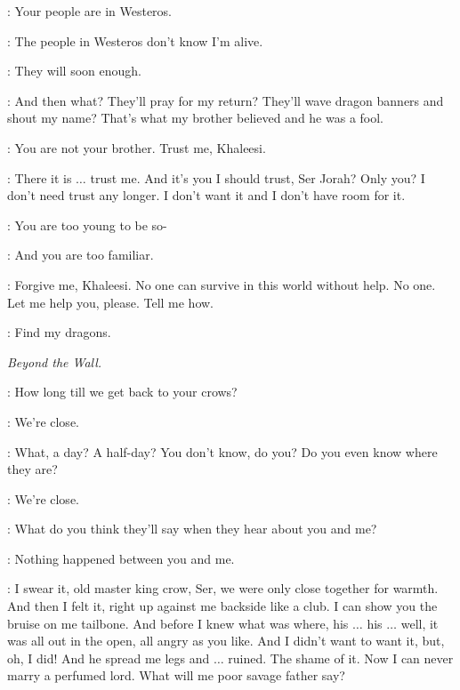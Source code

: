 \JORAH: Your people are in Westeros.

\DAENERYS: The people in Westeros don't know I'm alive.

\JORAH: They will soon enough.

\DAENERYS: And then what? They'll pray for my return? They'll wave dragon banners and shout my name? That's what my brother believed and he was a fool.

\JORAH: You are not your brother. Trust me, Khaleesi.

\DAENERYS: There it is $\ldots$  trust me. And it's you I should trust, Ser Jorah? Only you? I don't need trust any longer. I don't want it and I don't have room for it.

\JORAH: You are too young to be so-


\DAENERYS: And you are too familiar.

\JORAH: Forgive me, Khaleesi. No one can survive in this world without help. No one. Let me help you, please. Tell me how.

\DAENERYS: Find my dragons.


\scene

\textit{Beyond the Wall.}


\YGRITTE: How long till we get back to your crows?

\JON: We're close.

\YGRITTE: What, a day? A half-day? You don't know, do you? Do you even know where they are?

\JON: We're close.

\YGRITTE: What do you think they'll say when they hear about you and me?

\JON: Nothing happened between you and me.


\YGRITTE: I swear it, old master king crow, Ser, we were only close together for warmth. And then I felt it, right up against me backside like a club. I can show you the bruise on me tailbone. And before I knew what was where, his $\ldots$ his $\ldots$ well, it was all out in the open, all angry as you like. And I didn't want to want it, but, oh, I did! And he spread me legs and $\ldots$ ruined. The shame of it. Now I can never marry a perfumed lord. What will me poor savage father say?

